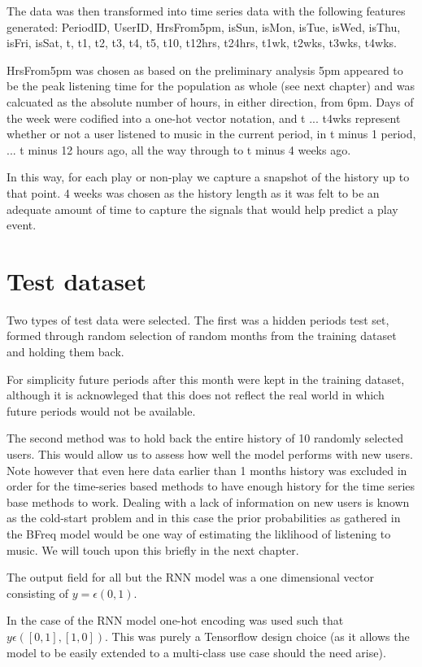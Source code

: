 The data was then transformed into time series data with the following features generated: PeriodID, UserID, HrsFrom5pm, isSun, isMon, isTue, isWed, isThu, isFri, isSat, t, t1, t2, t3, t4, t5, t10, t12hrs, t24hrs, t1wk, t2wks, t3wks, t4wks.

HrsFrom5pm was chosen as based on the preliminary analysis 5pm appeared to be the peak listening time for the population as whole (see next chapter) and was calcuated as the absolute number of hours, in either direction, from 6pm. Days of the week were codified into a one-hot vector notation, and t ... t4wks represent whether or not a user listened to music in the current period, in t minus 1 period, ... t minus 12 hours ago, all the way through to t minus 4 weeks ago.

In this way, for each play or non-play we capture a snapshot of the history up to that point. 4 weeks was chosen as the history length as it was felt to be an adequate amount of time to capture the signals that would help predict a play event.

\section{Test dataset}
 
Two types of test data were selected. The first was a hidden periods test set, formed through random selection of random months from the training dataset and holding them back. 

For simplicity future periods after this month were kept in the training dataset, although it is acknowleged that this does not reflect the real world in which future periods would not be available.

The second method was to hold back the entire history of 10 randomly selected users. This would allow us to assess how well the model performs with new users. Note however that even here data earlier than 1 months history was excluded in order for the time-series based methods to have enough history for the time series base methods to work. Dealing with a lack of information on new users is known as the cold-start problem and in this case the prior probabilities as gathered in the BFreq model would be one way of estimating the liklihood of listening to music. We will touch upon this briefly in the next chapter.

The output field for all but the RNN model was a one dimensional vector consisting of $y = \epsilon (0,1)$.

In the case of the RNN model one-hot encoding was used such that $y \epsilon ([0,1],[1,0])$. This was purely a Tensorflow design choice (as it allows the model to be easily extended to a multi-class use case should the need arise).

